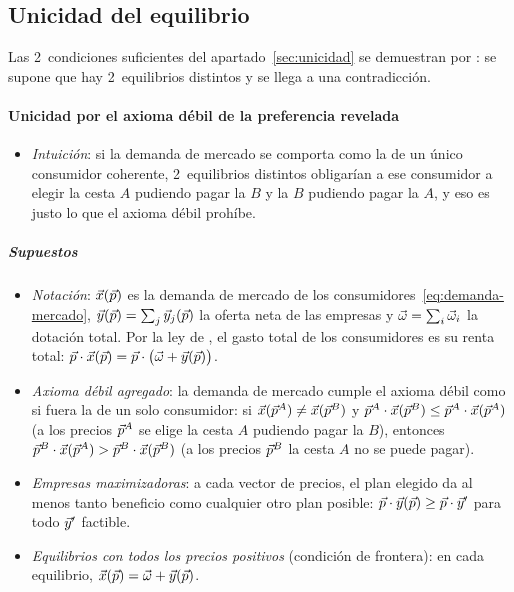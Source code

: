 \documentclass[11pt]{article}
\begin{document}
\subsection{Unicidad del equilibrio}\label{anexo:unicidad}

Las 2~condiciones suficientes del apartado~\ref{sec:unicidad} se demuestran por : se supone que hay 2~equilibrios distintos y se llega a una contradicción.

\paragraph{Unicidad por el axioma débil de la preferencia revelada}

\begin{itemize}
\item \emph{Intuición}: si la demanda de mercado se comporta como la de un único consumidor coherente, 2~equilibrios distintos obligarían a ese consumidor a elegir la cesta $A$ pudiendo pagar la $B$ y la $B$ pudiendo pagar la $A$, y eso es justo lo que el axioma débil prohíbe.
\end{itemize}

\subparagraph{Supuestos}

\begin{itemize}
\item \emph{Notación}: $\vec{x}(\vec{p})$ es la demanda de mercado de los consumidores~\eqref{eq:demanda-mercado}, $\vec{y}(\vec{p})=\sum_j\vec{y}_j(\vec{p})$ la oferta neta de las empresas y $\vec{\omega}=\sum_i\vec{\omega}_i$ la dotación total. Por la ley de , el gasto total de los consumidores es su renta total: $\vec{p}\cdot\vec{x}(\vec{p})=\vec{p}\cdot\big(\vec{\omega}+\vec{y}(\vec{p})\big)$.
\item \emph{Axioma débil agregado}: la demanda de mercado cumple el axioma débil como si fuera la de un solo consumidor: si $\vec{x}(\vec{p}^A)\neq\vec{x}(\vec{p}^B)$ y $\vec{p}^A\cdot\vec{x}(\vec{p}^B)\leq\vec{p}^A\cdot\vec{x}(\vec{p}^A)$ (a los precios $\vec{p}^A$ se elige la cesta $A$ pudiendo pagar la $B$), entonces $\vec{p}^B\cdot\vec{x}(\vec{p}^A)>\vec{p}^B\cdot\vec{x}(\vec{p}^B)$ (a los precios $\vec{p}^B$ la cesta $A$ no se puede pagar).
\item \emph{Empresas maximizadoras}: a cada vector de precios, el plan elegido da al menos tanto beneficio como cualquier otro plan posible: $\vec{p}\cdot\vec{y}(\vec{p})\geq\vec{p}\cdot\vec{y}'$ para todo $\vec{y}'$ factible.
\item \emph{Equilibrios con todos los precios positivos} (condición de frontera): en cada equilibrio, $\vec{x}(\vec{p})=\vec{\omega}+\vec{y}(\vec{p})$.
\end{itemize}
\end{document}
